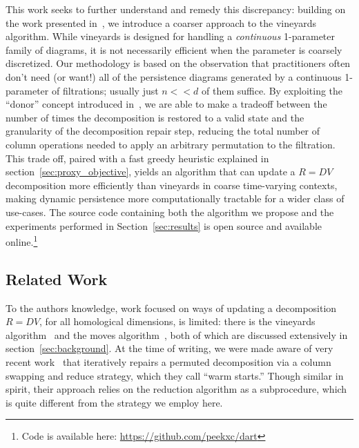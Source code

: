 \documentclass[sn-mathphys]{sn-jnl}
\begin{document}
This work seeks to further understand and remedy this discrepancy: building on the work presented in~\cite{busaryev2010tracking}, we introduce a coarser approach to the vineyards algorithm.
While vineyards is  designed  for handling a \emph{continuous} 1-parameter family of diagrams, it is not necessarily efficient when the parameter is coarsely discretized.
Our methodology is based on the observation that practitioners often don't need (or want!) all of the persistence diagrams generated by a continuous 1-parameter of filtrations; usually just $n << d$ of them  suffice.   
By exploiting the ``donor'' concept introduced in~\cite{busaryev2010tracking}, we are able to make a tradeoff between the number of times the decomposition is restored to a valid state and the granularity of the decomposition repair step, reducing the total number of column operations needed to apply an arbitrary permutation to the filtration. This trade off, paired with a fast greedy heuristic explained in section~\ref{sec:proxy_objective}, yields an algorithm that can update a $R = DV$ decomposition more efficiently than vineyards in coarse time-varying contexts, making dynamic persistence more computationally tractable for a wider class of use-cases. 
The source code containing both the algorithm we propose and the experiments performed in Section~\ref{sec:results} is open source and available online.\footnote{ Code is available here: \url{https://github.com/peekxc/dart}}
  
\subsection{Related Work}\label{sec:related_work} 
To the authors knowledge, work focused on ways of updating a  decomposition $R = DV$, for all homological dimensions, is limited: there is the vineyards algorithm~\cite{cohen2006vines} and the moves algorithm~\cite{busaryev2010tracking}, both of which are discussed extensively in section~\ref{sec:background}. At the time of writing, we were made aware of very recent work~\cite{luo2021accelerating} that iteratively repairs a permuted decomposition via a column swapping and reduce strategy, which they call ``warm starts.'' Though similar in spirit, their approach relies on the reduction algorithm as a subprocedure, which is quite different from the strategy we employ here.
\end{document}
